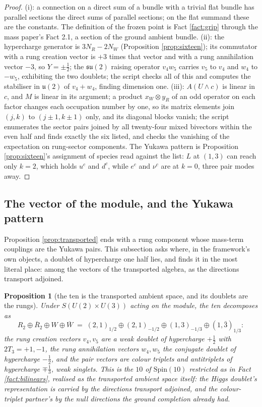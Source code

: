 \documentclass[11pt]{article}
\newtheorem{proposition}[theorem]{Proposition}
\theoremstyle{definition}
\newcommand{\su}{\mathfrak{su}}
\newcommand{\uu}{\mathfrak{u}}
\begin{document}
\begin{proof}
(i): a connection on a direct sum of a bundle with a trivial flat bundle has parallel sections the direct sums of parallel sections; on the flat summand these are the constants. The definition of the frozen point is Fact \ref{fact:grip} through the mass paper's Fact 2.1, a section of the ground ambient bundle. (ii): the hypercharge generator is $3N_{R} - 2N_{W}$ (Proposition \ref{prop:sixteen}); its commutator with a rung creation vector is $+3$ times that vector and with a rung annihilation vector $-3$, so $Y = \pm\tfrac12$; the $\su(2)$ raising operator $v_{4}w_{5}$ carries $v_{5}$ to $v_{4}$ and $w_{4}$ to $-w_{5}$, exhibiting the two doublets; the script checks all of this and computes the stabiliser in $\uu(2)$ of $v_{4} + w_{4}$, finding dimension one. (iii): $A(U \wedge c)$ is linear in $c$, and $M$ is linear in its argument; a product $x_{W} \otimes y_{R}$ of an odd operator on each factor changes each occupation number by one, so its matrix elements join $(j,k)$ to $(j \pm 1, k \pm 1)$ only, and its diagonal blocks vanish; the script enumerates the sector pairs joined by all twenty-four mixed bivectors within the even half and finds exactly the six listed, and checks the vanishing of the expectation on rung-sector components. The Yukawa pattern is Proposition \ref{prop:sixteen}'s assignment of species read against the list: $L$ at $(1,3)$ can reach only $k = 2$, which holds $u^{c}$ and $d^{c}$, while $e^{c}$ and $\nu^{c}$ are at $k = 0$, three pair modes away.
\end{proof}

\subsection{The vector of the module, and the Yukawa pattern}\label{subsec:yukawa}

Proposition \ref{prop:transported} ends with a rung component whose mass-term couplings are the Yukawa pairs. This subsection asks where, in the framework's own objects, a doublet of hypercharge one half lies, and finds it in the most literal place: among the vectors of the transported algebra, as the directions transport adjoined.

\begin{proposition}[the ten is the transported ambient space, and its doublets are the rungs]\label{prop:ten}
Under $S(U(2) \times U(3))$ acting on the module, the ten decomposes as
\[
R_{2} \oplus \overline{R}_{2} \oplus W \oplus \overline{W} \;=\; (2,1)_{1/2} \oplus (2,1)_{-1/2} \oplus (1,3)_{-1/3} \oplus (1,\bar{3})_{1/3}:
\]
the rung creation vectors $v_{4}, v_{5}$ are a weak doublet of hypercharge $+\tfrac12$ with $2T_{3} = +1, -1$, the rung annihilation vectors $w_{4}, w_{5}$ the conjugate doublet of hypercharge $-\tfrac12$, and the pair vectors are colour triplets and antitriplets of hypercharge $\mp\tfrac13$, weak singlets. This is the $10$ of $\mathrm{Spin}(10)$ restricted as in Fact \ref{fact:bilinears}, realised as the transported ambient space itself: the Higgs doublet's representation is carried by the directions transport adjoined, and the colour-triplet partner's by the null directions the ground completion already had.
\end{proposition}
\end{document}
